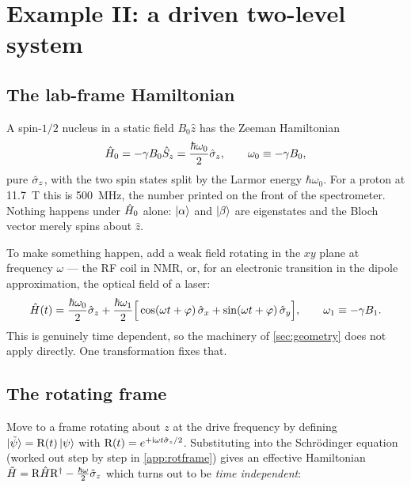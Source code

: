 \section{Example II: a driven two-level system}
\label{sec:driven}

\subsection{The lab-frame Hamiltonian}

A spin-$1/2$ nucleus in a static field $B_0\hat{z}$ has the Zeeman Hamiltonian
%
\begin{equation}
\hat{H}_0 = -\gamma B_0 \hat{S}_z = \frac{\hbar\omega_0}{2}\hat{\sigma}_z,
\qquad \omega_0 \equiv -\gamma B_0 ,
\end{equation}
%
pure $\hat{\sigma}_z$, with the two spin states split by the Larmor energy $\hbar\omega_0$. For a
proton at \SI{11.7}{\tesla} this is \SI{500}{\mega\hertz}, the number printed on the
front of the spectrometer. Nothing happens under $\hat{H}_0$ alone: $\ket{\alpha}$ and
$\ket{\beta}$ are eigenstates and the Bloch vector merely spins about $\hat{z}$.

To make something happen, add a weak field rotating in the $xy$ plane at frequency
$\omega$ --- the RF coil in NMR, or, for an electronic transition in the dipole
approximation, the optical field of a laser:
%
\begin{equation}
\hat{H}(t) = \frac{\hbar\omega_0}{2}\hat{\sigma}_z
  + \frac{\hbar\omega_1}{2}\Big[\cos(\omega t+\varphi)\,\hat{\sigma}_x + \sin(\omega t+\varphi)\,\hat{\sigma}_y\Big],
\qquad \omega_1 \equiv -\gamma B_1 .
\label{eq:lab-frame}
\end{equation}
%
This is genuinely time dependent, so the machinery of \cref{sec:geometry} does not apply
directly. One transformation fixes that.

\subsection{The rotating frame}

Move to a frame rotating about $z$ at the drive frequency by defining
$\ket{\tilde\psi} = \mathrm{R}(t)\ket{\psi}$ with $\mathrm{R}(t) = e^{+\mathrm{i}\omega t\hat{\sigma}_z/2}$. Substituting
into the Schr\"odinger equation (worked out step by step in \cref{app:rotframe}) gives
an effective Hamiltonian $\tilde{H} = \mathrm{R}\hat{H}\mathrm{R}^\dagger - \tfrac{\hbar\omega}{2}\hat{\sigma}_z$
which turns out to be \emph{time independent}:

